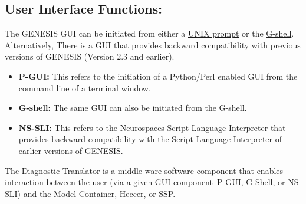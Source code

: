 \documentclass[12pt]{article}
\begin{document}
\subsection*{User Interface Functions:} The GENESIS GUI can be initiated from either a \href{../unix-linux/unix-linux.tex}{UNIX prompt} or the \href{../gshell/gshell.tex}{G-shell}. Alternatively, There is a GUI that provides backward compatibility with previous versions of GENESIS (Version 2.3 and earlier).

\begin{itemize}
   \item {\bf P-GUI:} This refers to the initiation of a Python/Perl enabled GUI from the command line of a terminal window.
   \item {\bf G-shell:} The same GUI can also be initiated from the G-shell.
   \item {\bf NS-SLI:} This refers to the Neurospaces Script Language Interpreter that provides backward compatibility with the Script Language Interpreter of earlier versions of GENESIS.
\end{itemize}

The Diagnostic Translator is a middle ware software component that enables interaction between the user (via a given GUI component--P-GUI, G-Shell, or NS-SLI) and the \href{../model-container/model-container.tex}{Model Container}, \href{../heccer/heccer.tex}{Heccer}, or \href{../ssp/ssp.tex}{SSP}.
\end{document}
